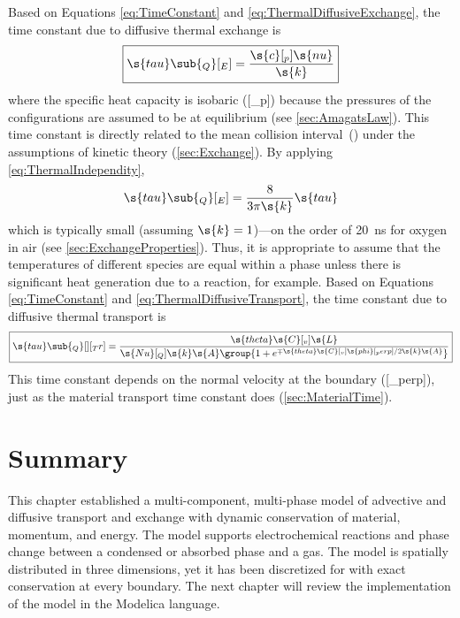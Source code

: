 Based on Equations \ref{eq:TimeConstant} and \ref{eq:ThermalDiffusiveExchange}, the time constant due to diffusive thermal exchange is
\begin{equation}
  \boxed{\s{tau}\sub{_Q}[_E] = \frac{\s{c}[_p]\s{nu}}{\s{k}}}
\end{equation}
where the specific heat capacity is isobaric ([_p]) because the pressures of the configurations are assumed to be at equilibrium (see \autoref{sec:AmagatsLaw}).  This time constant is directly related to the mean collision interval~() under the assumptions of kinetic theory (\autoref{sec:Exchange}).  By applying \autoref{eq:ThermalIndependity},
\begin{equation}
  \s{tau}\sub{_Q}[_E] = \frac{8}{3\pi\s{k}}\s{tau}
\end{equation}
which is typically small (assuming $\s{k} = 1$)---on the order of \SI{20}{ns} for oxygen in air (see \autoref{sec:ExchangeProperties}).  Thus, it is appropriate to assume that the temperatures of different species are equal within a phase unless there is significant heat generation due to a reaction, for example.  Based on Equations \ref{eq:TimeConstant} and \ref{eq:ThermalDiffusiveTransport}, the time constant due to diffusive thermal transport is
\begin{equation}
  \label{eq:TimeConstantThermalTransport}
  \boxed{\s{tau}\sub{_Q}[ ][_Tr] = \frac{\s{theta}\s{C}[_v]\s{L}}{\s{Nu}[_Q]\s{k}\s{A}\group{1 + e^{\mp\s{theta}\s{C}[_v]\s{phi}[_perp]/2\s{k}\s{A}}}}}
\end{equation}
This time constant depends on the normal velocity at the boundary ([_perp]), just as the material transport time constant does (\autoref{sec:MaterialTime}).



\section{Summary}

This chapter established a multi-component, multi-phase model of advective and diffusive transport and exchange with dynamic conservation of material, momentum, and energy.  The model supports electrochemical reactions and phase change between a condensed or absorbed phase and a gas.  The model is spatially distributed in three dimensions, yet it has been discretized for  with exact conservation at every boundary.  The next chapter will review the implementation of the model in the Modelica language.


\renewenvironment{contextbox}
{\vspace{-0.7em}
   \begin{framed}
    \begin{singlespaced}
   \setlength\parindent{0pt}}
{  \end{singlespaced}
 \end{framed}}
